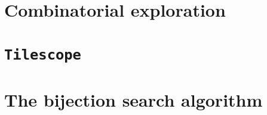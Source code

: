 
\label{ch:search}
\section{Combinatorial exploration}
\section{\texttt{Tilescope}}
\section{The bijection search algorithm}